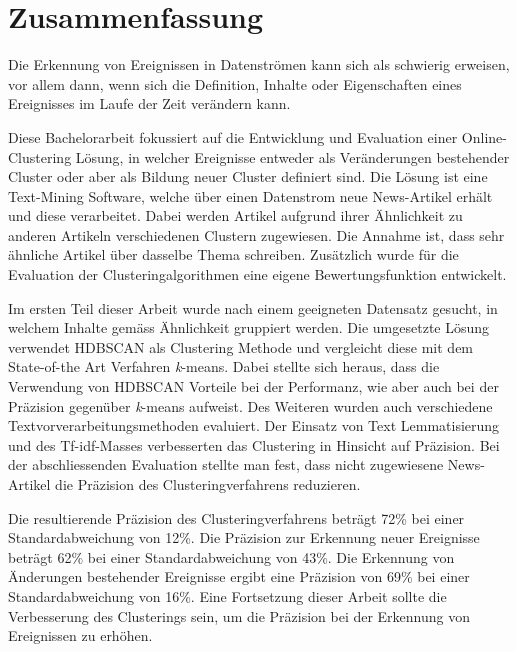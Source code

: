 \section*{Zusammenfassung}
\label{sec:0_zusammenfassung}

Die Erkennung von Ereignissen in Datenströmen kann sich als schwierig erweisen, vor allem dann,
wenn sich die Definition, Inhalte oder Eigenschaften eines Ereignisses im Laufe der Zeit verändern kann.

Diese Bachelorarbeit fokussiert auf die Entwicklung und Evaluation einer Online-Clustering Lösung,
in welcher Ereignisse entweder als Veränderungen bestehender Cluster oder aber als Bildung neuer Cluster
definiert sind.
Die Lösung ist eine Text-Mining Software, welche über einen Datenstrom neue News-Artikel erhält
und diese verarbeitet.
Dabei werden Artikel aufgrund ihrer Ähnlichkeit zu anderen Artikeln verschiedenen Clustern zugewiesen.
Die Annahme ist, dass sehr ähnliche Artikel über dasselbe Thema schreiben.
Zusätzlich wurde für die Evaluation der Clusteringalgorithmen eine eigene Bewertungsfunktion entwickelt.

Im ersten Teil dieser Arbeit wurde nach einem geeigneten Datensatz gesucht,
in welchem Inhalte gemäss Ähnlichkeit gruppiert werden.
Die umgesetzte Lösung verwendet HDBSCAN als Clustering Methode und vergleicht diese
mit dem State-of-the Art Verfahren \textit{k}-means.
Dabei stellte sich heraus, dass die Verwendung von HDBSCAN Vorteile bei der Performanz,
wie aber auch bei der Präzision gegenüber \textit{k}-means aufweist.
Des Weiteren wurden auch verschiedene Textvorverarbeitungsmethoden evaluiert.
Der Einsatz von Text Lemmatisierung und des Tf-idf-Masses verbesserten
das Clustering in Hinsicht auf Präzision.
Bei der abschliessenden Evaluation stellte man fest,
dass nicht zugewiesene News-Artikel die Präzision des Clusteringverfahrens reduzieren.

Die resultierende Präzision des Clusteringverfahrens beträgt 72\% bei einer Standardabweichung von 12\%.
Die Präzision zur Erkennung neuer Ereignisse beträgt 62\% bei einer Standardabweichung von 43\%.
Die Erkennung von Änderungen bestehender Ereignisse ergibt eine
Präzision von 69\% bei einer Standardabweichung von 16\%.
Eine Fortsetzung dieser Arbeit sollte die Verbesserung des Clusterings sein,
um die Präzision bei der Erkennung von Ereignissen zu erhöhen.
